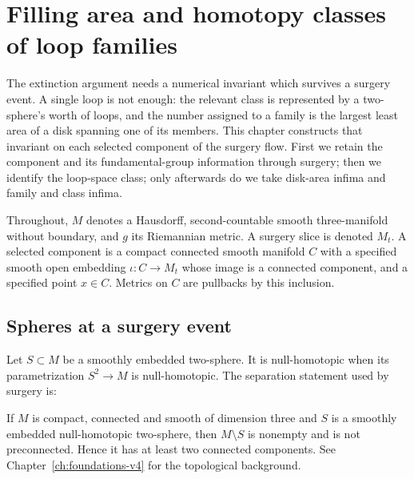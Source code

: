 \chapter{Filling area and homotopy classes of loop families}
\label{ch:filling-width-v4}

The extinction argument needs a numerical invariant which survives a surgery
event. A single loop is not enough: the relevant class is represented by a
two-sphere's worth of loops, and the number assigned to a family is the
largest least area of a disk spanning one of its members. This chapter
constructs that invariant on each selected component of the surgery flow.
First we retain the component and its fundamental-group information through
surgery; then we identify the loop-space class; only afterwards do we take
disk-area infima and family and class infima.

Throughout, $M$ denotes a Hausdorff, second-countable smooth three-manifold
without boundary, and $g$ its Riemannian metric. A surgery slice is denoted
$M_t$. A selected component is a compact connected smooth manifold $C$
with a specified smooth open embedding $\iota:C\to M_t$ whose image is a
connected component, and a specified point $x\in C$. Metrics on $C$ are
pullbacks by this inclusion.

\section{Spheres at a surgery event}
\label{sec:filling-surgery-spheres}

Let $S\subset M$ be a smoothly embedded two-sphere. It is null-homotopic when
its parametrization $S^2\to M$ is null-homotopic. The separation statement used by
surgery is:

\begin{proposition}
\label{prop:filling-sphere-separation}
If $M$ is compact, connected and smooth of dimension three and $S$ is a
smoothly embedded null-homotopic two-sphere, then $M\setminus S$ is nonempty and is
not preconnected. Hence it has at least two connected components.
See Chapter~\ref{ch:foundations-v4} for the topological background.
\end{proposition}

